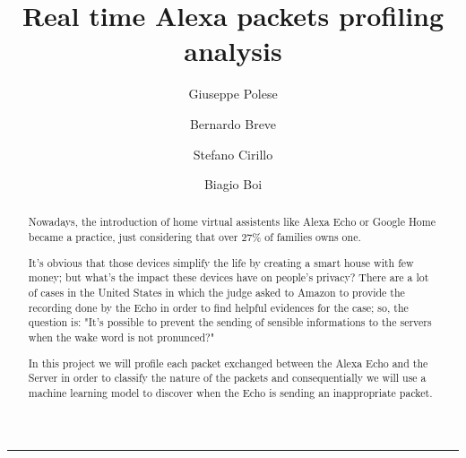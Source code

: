 \documentclass[sigconf]{acmart}
\begin{document}
    \title{Real time Alexa packets profiling analysis}


    \author{Giuseppe Polese}

    \author{Bernardo Breve}
    \author{Stefano Cirillo}

    \author{Biagio Boi}

    \begin{abstract}
        Nowadays, the introduction of home virtual assistents like Alexa Echo or Google Home became a practice, just considering that over 27\% of families owns one.

        It's obvious that those devices simplify the life by creating a smart house with few money; but what's the impact these devices have on people's privacy?
        There are a lot of cases in the United States in which the judge asked to Amazon to provide the recording done by the Echo in order to find helpful
        evidences for the case; so, the question is: "It's possible to prevent the sending of sensible informations to the servers when the wake word is not pronunced?"

        In this project we will profile each packet exchanged between the Alexa Echo and the Server in order to classify the nature of the packets and consequentially we will use a machine learning model to discover when the Echo is sending an inappropriate packet.
    \end{abstract}



    \begin{teaserfigure}
        \rule{\linewidth}{1mm}
    \end{teaserfigure}
\end{document}
